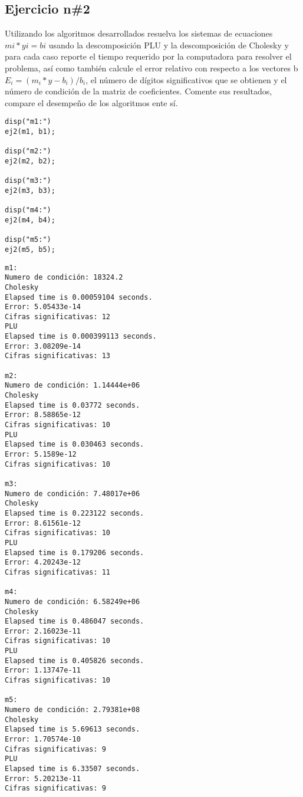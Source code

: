 \documentclass[10pt]{article}
\begin{document}
{}
\subsection*{Ejercicio n\#2}



Utilizando los algoritmos desarrollados resuelva los sistemas de ecuaciones
$mi*yi=bi$ usando la descomposición PLU y la descomposición de Cholesky y para
cada caso reporte el tiempo requerido por la computadora para resolver el
problema, así como también calcule el error relativo con respecto a los
vectores b $E_i=(m_i*y - b_i)/b_i$, el número de dígitos significativos que se
obtienen y el número de condición de la matriz de coeficientes. Comente sus
resultados, compare el desempeño de los algoritmos ente sí.

\begin{lstlisting}
disp("m1:")
ej2(m1, b1);

disp("m2:")
ej2(m2, b2);

disp("m3:")
ej2(m3, b3);

disp("m4:")
ej2(m4, b4);

disp("m5:")
ej2(m5, b5);
\end{lstlisting}
\begin{lstlisting}[language={},xleftmargin=5pt,frame=none]
m1:
Numero de condición: 18324.2
Cholesky
Elapsed time is 0.00059104 seconds.
Error: 5.05433e-14
Cifras significativas: 12
PLU
Elapsed time is 0.000399113 seconds.
Error: 3.08209e-14
Cifras significativas: 13
 
m2:
Numero de condición: 1.14444e+06
Cholesky
Elapsed time is 0.03772 seconds.
Error: 8.58865e-12
Cifras significativas: 10
PLU
Elapsed time is 0.030463 seconds.
Error: 5.1589e-12
Cifras significativas: 10
 
m3:
Numero de condición: 7.48017e+06
Cholesky
Elapsed time is 0.223122 seconds.
Error: 8.61561e-12
Cifras significativas: 10
PLU
Elapsed time is 0.179206 seconds.
Error: 4.20243e-12
Cifras significativas: 11
 
m4:
Numero de condición: 6.58249e+06
Cholesky
Elapsed time is 0.486047 seconds.
Error: 2.16023e-11
Cifras significativas: 10
PLU
Elapsed time is 0.405826 seconds.
Error: 1.13747e-11
Cifras significativas: 10
 
m5:
Numero de condición: 2.79381e+08
Cholesky
Elapsed time is 5.69613 seconds.
Error: 1.70574e-10
Cifras significativas: 9
PLU
Elapsed time is 6.33507 seconds.
Error: 5.20213e-11
Cifras significativas: 9
 

\end{lstlisting}
\end{document}
